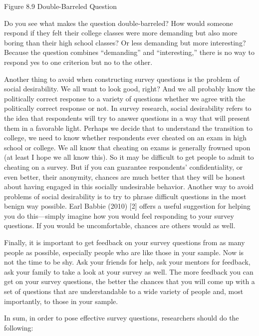 Figure 8.9 Double-Barreled Question

Do you see what makes the question double-barreled? How would someone respond if they felt their college classes were more demanding but also more boring than their high school classes? Or less demanding but more interesting? Because the question combines “demanding” and “interesting,” there is no way to respond yes to one criterion but no to the other.

Another thing to avoid when constructing survey questions is the problem of social desirability. We all want to look good, right? And we all probably know the politically correct response to a variety of questions whether we agree with the politically correct response or not. In survey research, social desirability refers to the idea that respondents will try to answer questions in a way that will present them in a favorable light. Perhaps we decide that to understand the transition to college, we need to know whether respondents ever cheated on an exam in high school or college. We all know that cheating on exams is generally frowned upon (at least I hope we all know this). So it may be difficult to get people to admit to cheating on a survey. But if you can guarantee respondents’ confidentiality, or even better, their anonymity, chances are much better that they will be honest about having engaged in this socially undesirable behavior. Another way to avoid problems of social desirability is to try to phrase difficult questions in the most benign way possible. Earl Babbie (2010) [2] offers a useful suggestion for helping you do this—simply imagine how you would feel responding to your survey questions. If you would be uncomfortable, chances are others would as well.

Finally, it is important to get feedback on your survey questions from as many people as possible, especially people who are like those in your sample. Now is not the time to be shy. Ask your friends for help, ask your mentors for feedback, ask your family to take a look at your survey as well. The more feedback you can get on your survey questions, the better the chances that you will come up with a set of questions that are understandable to a wide variety of people and, most importantly, to those in your sample.

In sum, in order to pose effective survey questions, researchers should do the following:

